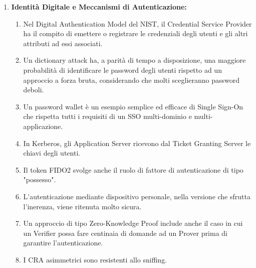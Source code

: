 \documentclass[11pt,a4paper]{article}
\begin{document}
\begin{questionbox}
\begin{enumerate}[label=\textbf{1.\arabic*}]
    \item \textbf{Identit\`a Digitale e Meccanismi di Autenticazione:}
    \begin{enumerate}[label=\alph*.]
        \item Nel Digital Authentication Model del NIST, il Credential Service Provider ha il compito di emettere o registrare le credenziali degli utenti e gli altri attributi ad essi associati.
        \item Un dictionary attack ha, a parit\`a di tempo a disposizione, una maggiore probabilit\`a di identificare le password degli utenti rispetto ad un approccio a forza bruta, considerando che molti sceglieranno password deboli.
        \item Un password wallet \`e un esempio semplice ed efficace di Single Sign-On che rispetta tutti i requisiti di un SSO multi-dominio e multi-applicazione.
        \item In Kerberos, gli Application Server ricevono dal Ticket Granting Server le chiavi degli utenti.
        \item Il token FIDO2 svolge anche il ruolo di fattore di autenticazione di tipo "possesso".
        \item L'autenticazione mediante dispositivo personale, nella versione che sfrutta l'inerenza, viene ritenuta molto sicura.
        \item Un approccio di tipo Zero-Knowledge Proof include anche il caso in cui un Verifier possa fare centinaia di domande ad un Prover prima di garantire l'autenticazione.
        \item I CRA asimmetrici sono resistenti allo sniffing.
    \end{enumerate}


\end{enumerate}
\end{questionbox}
\end{document}
